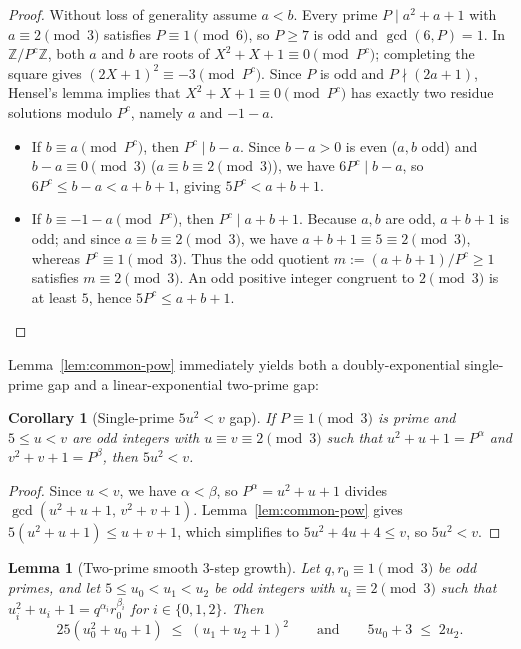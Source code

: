 \documentclass[11pt]{amsart}
\newtheorem{lemma}[theorem]{Lemma}
\newtheorem{corollary}[theorem]{Corollary}
\theoremstyle{definition}
\theoremstyle{remark}
\begin{document}
\begin{proof}
Without loss of generality assume $a < b$. Every prime $P \mid a^2 + a + 1$ with $a \equiv 2 \pmod 3$ satisfies $P \equiv 1 \pmod 6$, so $P \ge 7$ is odd and $\gcd(6, P) = 1$. In $\mathbb{Z}/P^c\mathbb{Z}$, both $a$ and $b$ are roots of $X^2 + X + 1 \equiv 0 \pmod{P^c}$; completing the square gives $(2X + 1)^2 \equiv -3 \pmod{P^c}$. Since $P$ is odd and $P \nmid (2a + 1)$, Hensel's lemma implies that $X^2 + X + 1 \equiv 0 \pmod{P^c}$ has exactly two residue solutions modulo $P^c$, namely $a$ and $-1 - a$.
\begin{itemize}
  \item If $b \equiv a \pmod{P^c}$, then $P^c \mid b - a$. Since $b - a > 0$ is even ($a, b$ odd) and $b - a \equiv 0 \pmod 3$ ($a \equiv b \equiv 2 \pmod 3$), we have $6 P^c \mid b - a$, so $6 P^c \le b - a < a + b + 1$, giving $5 P^c < a + b + 1$.
  \item If $b \equiv -1 - a \pmod{P^c}$, then $P^c \mid a + b + 1$. Because $a, b$ are odd, $a + b + 1$ is odd; and since $a \equiv b \equiv 2 \pmod 3$, we have $a + b + 1 \equiv 5 \equiv 2 \pmod 3$, whereas $P^c \equiv 1 \pmod 3$. Thus the odd quotient $m := (a + b + 1)/P^c \ge 1$ satisfies $m \equiv 2 \pmod 3$. An odd positive integer congruent to $2 \pmod 3$ is at least $5$, hence $5 P^c \le a + b + 1$. \qedhere
\end{itemize}
\end{proof}

Lemma~\ref{lem:common-pow} immediately yields both a doubly-exponential single-prime gap and a linear-exponential two-prime gap:

\begin{corollary}[Single-prime $5u^2 < v$ gap]\label{cor:single-prime}
If $P \equiv 1 \pmod 3$ is prime and $5 \le u < v$ are odd integers with $u \equiv v \equiv 2 \pmod 3$ such that $u^2 + u + 1 = P^\alpha$ and $v^2 + v + 1 = P^\beta$, then $5 u^2 < v$.
\end{corollary}

\begin{proof}
Since $u < v$, we have $\alpha < \beta$, so $P^\alpha = u^2 + u + 1$ divides $\gcd(u^2 + u + 1,\, v^2 + v + 1)$. Lemma~\ref{lem:common-pow} gives $5(u^2 + u + 1) \le u + v + 1$, which simplifies to $5u^2 + 4u + 4 \le v$, so $5u^2 < v$.
\end{proof}

\begin{lemma}[Two-prime smooth $3$-step growth]\label{lem:two-prime-step}
Let $q, r_0 \equiv 1 \pmod 3$ be odd primes, and let $5 \le u_0 < u_1 < u_2$ be odd integers with $u_i \equiv 2 \pmod 3$ such that $u_i^2 + u_i + 1 = q^{\alpha_i} r_0^{\beta_i}$ for $i \in \{0, 1, 2\}$. Then
\[
  25(u_0^2 + u_0 + 1) \;\le\; (u_1 + u_2 + 1)^2 \qquad \text{and} \qquad 5 u_0 + 3 \;\le\; 2 u_2.
\]
\end{lemma}
\end{document}
